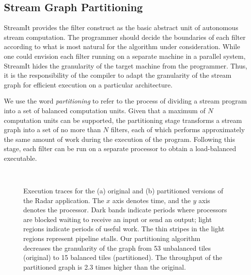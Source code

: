 \newcommand{\mt}[1]{\mbox{\it #1}}

\subsection{Stream Graph Partitioning}
\label{sec:partition}

StreamIt provides the filter construct as the basic abstract unit of
autonomous stream computation.  The programmer should decide the
boundaries of each filter according to what is most natural for the
algorithm under consideration.  While one could envision each filter
running on a separate machine in a parallel system, StreamIt hides the
granularity of the target machine from the programmer.  Thus, it is
the responsibility of the compiler to adapt the granularity of the
stream graph for efficient execution on a particular architecture.

We use the word {\it partitioning} to refer to the process of dividing
a stream program into a set of balanced computation units.  Given that
a maximum of $N$ computation units can be supported, the partitioning
stage transforms a stream graph into a set of no more than $N$
filters, each of which performs approximately the same amount of work
during the execution of the program.  Following this stage, each
filter can be run on a separate processor to obtain a load-balanced
executable.


\begin{figure}[htpb]
   \\
  \hspace{0.3in}  \vspace{-6pt} \caption{\protect\small Execution
    traces for the (a) original and (b) partitioned versions of the
    Radar application.  The $x$ axis denotes time, and the $y$ axis
    denotes the processor.  Dark bands indicate periods where
    processors are blocked waiting to receive an input or send an
    output; light regions indicate periods of useful work.  The thin
    stripes in the light regions represent pipeline stalls.  Our
    partitioning algorithm decreases the granularity of the graph from
    53 unbalanced tiles (original) to 15 balanced tiles (partitioned).
    The throughput of the partitioned graph is 2.3 times higher than
    the original. \protect\label{fig:beam-blood}}
\vspace{-12pt}
\end{figure}


